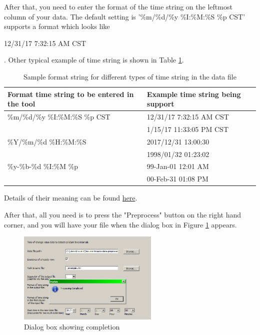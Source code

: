 \documentclass[12pt,a4paper]{article}
\begin{document}
After that, you need to enter the format of the time string on the leftmost column of your data. The default setting is '\%m/\%d/\%y \%I:\%M:\%S \%p CST' supports a format which looks like

12/31/17 7:32:15 AM CST

. Other typical example of time string is shown in Table \ref{tb:sample_timestring}.

\begin{table}[H]
\caption{Sample format string for different types of time string in the data file}
\begin{tabular}{|p{6cm}|l|}
\hline
Format time string to be entered in the tool & Example time string being support \\ \hline
\%m/\%d/\%y \%I:\%M:\%S \%p CST & 12/31/17 7:32:15 AM CST  \\
 & 1/15/17 11:33:05 PM CST \\ \hline
\%Y/\%m/\%d \%H:\%M:\%S & 2017/12/31 13:00:30  \\
 & 1998/01/32 01:23:02 \\ \hline
 \%y-\%b-\%d \%I:\%M \%p & 99-Jan-01 12:01 AM \\
 & 00-Feb-31 01:08 PM \\ \hline
\end{tabular}
\label{tb:sample_timestring}
\end{table}

Details of their meaning can be found \href{https://docs.python.org/3.5/library/datetime.html\#strftime-and-strptime-behavior}{here}.

After that, all you need is to press the "Preprocess" button on the right hand corner, and you will have your file when the dialog box in Figure \ref{fig:complete} appears.

\begin{figure}[H]
\centering
\includegraphics[width=0.6\textwidth]{complete.png}
\caption{Dialog box showing completion}
\label{fig:complete}
\end{figure}
\end{document}
